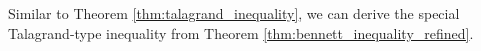 \documentclass{article}
\def\vx{{\mathbf{x}}}
\def\eE{\mathbb{E}}
\def\pP{\mathbb{P}}
\begin{document}

Similar to Theorem \ref{thm:talagrand_inequality}, we can derive the special Talagrand-type inequality from Theorem \ref{thm:bennett_inequality_refined}.
\end{document}
